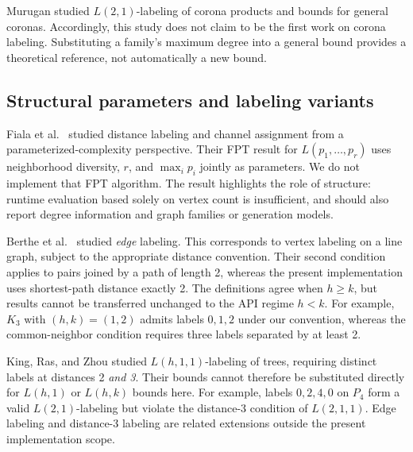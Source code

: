 Murugan \cite{murugan2015corona} studied $L(2,1)$-labeling of corona products
and bounds for general coronas. Accordingly, this study does not claim to be
the first work on corona labeling. Substituting a family's maximum degree
into a general bound provides a theoretical reference, not automatically a new bound.

\subsection{Structural parameters and labeling variants}
Fiala et al.\ \cite{fiala2018parameterized} studied distance labeling and
channel assignment from a parameterized-complexity perspective. Their FPT
result for $L(p_1,\ldots,p_r)$ uses neighborhood diversity, $r$, and
$\max_i p_i$ jointly as parameters. We do not implement that FPT algorithm.
The result highlights the role of structure: runtime evaluation based solely
on vertex count is insufficient, and should also report degree information
and graph families or generation models.

Berthe et al.\ \cite{berthe2023edge} studied \emph{edge} labeling. This
corresponds to vertex labeling on a line graph, subject to the appropriate
distance convention. Their second condition applies to pairs joined by a
path of length 2, whereas the present implementation uses shortest-path
distance exactly 2. The definitions agree when $h\geq k$, but results cannot
be transferred unchanged to the API regime $h<k$. For example, $K_3$ with
$(h,k)=(1,2)$ admits labels $0,1,2$ under our convention, whereas the
common-neighbor condition requires three labels separated by at least 2.

King, Ras, and Zhou \cite{king2010trees} studied $L(h,1,1)$-labeling of trees,
requiring distinct labels at distances 2 \emph{and 3}. Their bounds cannot
therefore be substituted directly for $L(h,1)$ or $L(h,k)$ bounds here.
For example, labels $0,2,4,0$ on $P_4$ form a valid $L(2,1)$-labeling but
violate the distance-3 condition of $L(2,1,1)$. Edge labeling and distance-3
labeling are related extensions outside the present implementation scope.

